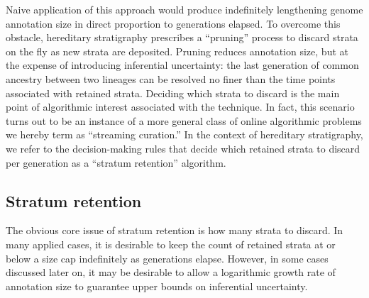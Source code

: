 Naive application of this approach would produce indefinitely lengthening genome annotation size in direct proportion to generations elapsed.
To overcome this obstacle, hereditary stratigraphy prescribes a ``pruning'' process to discard strata on the fly as new strata are deposited.
Pruning reduces annotation size, but at the expense of introducing inferential uncertainty: the last generation of common ancestry between two lineages can be resolved no finer than the time points associated with retained strata.
Deciding which strata to discard is the main point of algorithmic interest associated with the technique.
In fact, this scenario turns out to be an instance of a more general class of online algorithmic problems we hereby term as ``streaming curation.''
In the context of hereditary stratigraphy, we refer to the decision-making rules that decide which retained strata to discard per generation as a ``stratum retention'' algorithm.


\subsection{Stratum retention}

The obvious core issue of stratum retention is how many strata to discard.
In many applied cases, it is desirable to keep the count of retained strata at or below a size cap indefinitely as generations elapse.
However, in some cases discussed later on, it may be desirable to allow a logarithmic growth rate of annotation size to guarantee upper bounds on inferential uncertainty.

